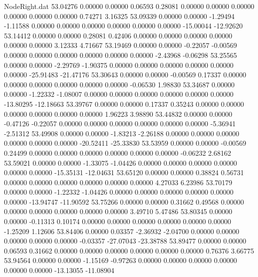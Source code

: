\begin{filecontents}{NodeRight.dat}
  53.04276    0.00000    0.00000     0.06593    0.28081    0.00000    0.00000    0.00000    0.00000    0.00000    0.00000    0.74271    3.16325
  53.09339    0.00000    0.00000    -1.29494   -1.11588    0.00000    0.00000    0.00000    0.00000    0.00000    0.00000  -15.00044  -12.92620
  53.14412    0.00000    0.00000     0.28081    0.42406    0.00000    0.00000    0.00000    0.00000    0.00000    0.00000    3.12333    4.71667
  53.19469    0.00000    0.00000    -0.22057   -0.00569    0.00000    0.00000    0.00000    0.00000    0.00000    0.00000   -2.43968   -0.06298
  53.25565    0.00000    0.00000    -2.29769   -1.90375    0.00000    0.00000    0.00000    0.00000    0.00000    0.00000  -25.91483  -21.47176
  53.30643    0.00000    0.00000    -0.00569    0.17337    0.00000    0.00000    0.00000    0.00000    0.00000    0.00000   -0.06530    1.98830
  53.34687    0.00000    0.00000    -1.22332   -1.08007    0.00000    0.00000    0.00000    0.00000    0.00000    0.00000  -13.80295  -12.18663
  53.39767    0.00000    0.00000     0.17337    0.35243    0.00000    0.00000    0.00000    0.00000    0.00000    0.00000    1.96223    3.98890
  53.44832    0.00000    0.00000    -0.47126   -0.22057    0.00000    0.00000    0.00000    0.00000    0.00000    0.00000   -5.36941   -2.51312
  53.49908    0.00000    0.00000    -1.83213   -2.26188    0.00000    0.00000    0.00000    0.00000    0.00000    0.00000  -20.52411  -25.33830
  53.53959    0.00000    0.00000    -0.00569    0.24499    0.00000    0.00000    0.00000    0.00000    0.00000    0.00000   -0.06232    2.68162
  53.59021    0.00000    0.00000    -1.33075   -1.04426    0.00000    0.00000    0.00000    0.00000    0.00000    0.00000  -15.35131  -12.04631
  53.65120    0.00000    0.00000     0.38824    0.56731    0.00000    0.00000    0.00000    0.00000    0.00000    0.00000    4.27033    6.23986
  53.70179    0.00000    0.00000    -1.22332   -1.04426    0.00000    0.00000    0.00000    0.00000    0.00000    0.00000  -13.94747  -11.90592
  53.75266    0.00000    0.00000     0.31662    0.49568    0.00000    0.00000    0.00000    0.00000    0.00000    0.00000    3.49710    5.47486
  53.80345    0.00000    0.00000    -0.11313    0.10174    0.00000    0.00000    0.00000    0.00000    0.00000    0.00000   -1.25209    1.12606
  53.84406    0.00000    0.03357    -2.36932   -2.04700    0.00000    0.00000    0.00000    0.00000    0.00000   -0.03357  -27.07043  -23.38788
  53.89477    0.00000    0.00000     0.06593    0.31662    0.00000    0.00000    0.00000    0.00000    0.00000    0.00000    0.76376    3.66775
  53.94564    0.00000    0.00000    -1.15169   -0.97263    0.00000    0.00000    0.00000    0.00000    0.00000    0.00000  -13.13055  -11.08904

\end{filecontents}
